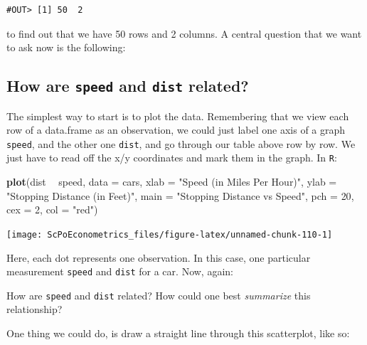 \documentclass[]{book}
\newenvironment{Shaded}{\begin{snugshade}}{\end{snugshade}}
\newcommand{\KeywordTok}[1]{\textcolor[rgb]{0.13,0.29,0.53}{\textbf{#1}}}
\newcommand{\DataTypeTok}[1]{\textcolor[rgb]{0.13,0.29,0.53}{#1}}
\newcommand{\DecValTok}[1]{\textcolor[rgb]{0.00,0.00,0.81}{#1}}
\newcommand{\StringTok}[1]{\textcolor[rgb]{0.31,0.60,0.02}{#1}}
\newcommand{\OperatorTok}[1]{\textcolor[rgb]{0.81,0.36,0.00}{\textbf{#1}}}
\newcommand{\NormalTok}[1]{#1}
\newenvironment{note}{\begin{tcolorbox}[colback=blue!5!white,colframe=blue!75!black]}{\end{tcolorbox}}
\begin{document}
\begin{verbatim}
#OUT> [1] 50  2
\end{verbatim}

to find out that we have 50 rows and 2 columns. A central question that
we want to ask now is the following:

\subsection{\texorpdfstring{How are \texttt{speed} and \texttt{dist}
related?}{How are speed and dist related?}}\label{how-are-speed-and-dist-related}

The simplest way to start is to plot the data. Remembering that we view
each row of a data.frame as an observation, we could just label one axis
of a graph \texttt{speed}, and the other one \texttt{dist}, and go
through our table above row by row. We just have to read off the x/y
coordinates and mark them in the graph. In \texttt{R}:

\begin{Shaded}
\begin{Highlighting}[]
\KeywordTok{plot}\NormalTok{(dist }\OperatorTok{~}\StringTok{ }\NormalTok{speed, }\DataTypeTok{data =}\NormalTok{ cars,}
     \DataTypeTok{xlab =} \StringTok{"Speed (in Miles Per Hour)"}\NormalTok{,}
     \DataTypeTok{ylab =} \StringTok{"Stopping Distance (in Feet)"}\NormalTok{,}
     \DataTypeTok{main =} \StringTok{"Stopping Distance vs Speed"}\NormalTok{,}
     \DataTypeTok{pch  =} \DecValTok{20}\NormalTok{,}
     \DataTypeTok{cex  =} \DecValTok{2}\NormalTok{,}
     \DataTypeTok{col  =} \StringTok{"red"}\NormalTok{)}
\end{Highlighting}
\end{Shaded}

\begin{center}\texttt{[image: ScPoEconometrics\_files/figure-latex/unnamed-chunk-110-1]} \end{center}

Here, each dot represents one observation. In this case, one particular
measurement \texttt{speed} and \texttt{dist} for a car. Now, again:

\begin{note}
How are \texttt{speed} and \texttt{dist} related? How could one best
\emph{summarize} this relationship?
\end{note}

 One thing we could do, is draw a straight line through this
scatterplot, like so:
\end{document}
